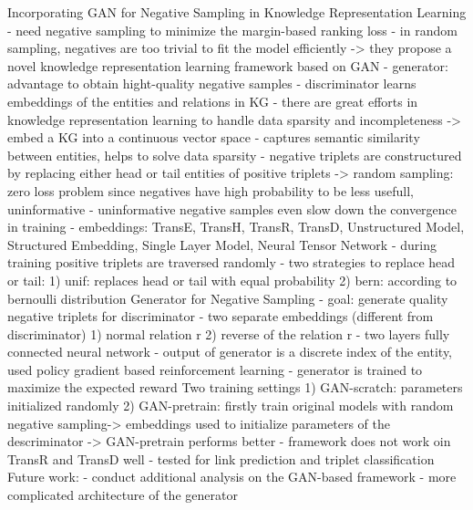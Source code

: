\cite{wang2018incorporating}
Incorporating GAN for Negative Sampling in Knowledge Representation Learning
- need negative sampling to minimize the margin-based ranking loss
- in random sampling, negatives are too trivial to fit the model efficiently
-> they propose a novel knowledge representation learning framework based on GAN
- generator: advantage to obtain hight-quality negative samples
- discriminator learns embeddings of the entities and relations in KG
- there are great efforts in knowledge representation learning to handle data sparsity and incompleteness
-> embed a KG into a continuous vector space
- captures semantic similarity between entities, helps to solve data sparsity
- negative triplets are constructured by replacing either head or tail entities of positive triplets
-> random sampling: zero loss problem since negatives have high probability to be less usefull, uninformative
- uninformative negative samples even slow down the convergence in training
- embeddings: TransE, TransH, TransR, TransD, Unstructured Model, Structured Embedding, Single Layer Model, Neural Tensor Network
- during training positive triplets are traversed randomly
- two strategies to replace head or tail:
    1) unif: replaces head or tail with equal probability
    2) bern: according to bernoulli distribution
Generator for Negative Sampling
- goal: generate quality negative triplets for discriminator
- two separate embeddings (different from discriminator)
    1) normal relation r 2) reverse of the relation r
- two layers fully connected neural network
- output of generator is a discrete index of the entity, used policy gradient based reinforcement learning
- generator is trained to maximize the expected reward
Two training settings
    1) GAN-scratch: parameters initialized randomly
    2) GAN-pretrain: firstly train original models with random negative sampling-> embeddings used to initialize parameters of the descriminator
-> GAN-pretrain performs better
- framework does not work oin TransR and TransD well
- tested for link prediction and triplet classification
Future work:
- conduct additional analysis on the GAN-based framework
- more complicated architecture of the generator

